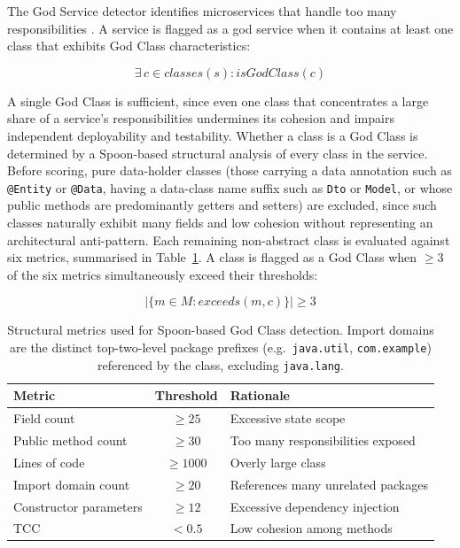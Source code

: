 \par The God Service detector identifies microservices that handle too many responsibilities \cite{Brown1998}. A service is flagged as a god service when it contains at least one class that exhibits God Class characteristics:

\begin{equation}
    \exists\, c \in \mathit{classes}(s) : \mathit{isGodClass}(c)
    \label{eq:god-service-detection}
\end{equation}

\noindent A single God Class is sufficient, since even one class that concentrates a large share of a service's responsibilities undermines its cohesion and impairs independent deployability and testability. Whether a class is a God Class is determined by a Spoon-based structural analysis of every class in the service. Before scoring, pure data-holder classes (those carrying a data annotation such as \texttt{@Entity} or \texttt{@Data}, having a data-class name suffix such as \texttt{Dto} or \texttt{Model}, or whose public methods are predominantly getters and setters) are excluded, since such classes naturally exhibit many fields and low cohesion without representing an architectural anti-pattern. Each remaining non-abstract class is evaluated against six metrics, summarised in Table~\ref{tab:god-class-metrics}. A class is flagged as a God Class when $\geq 3$ of the six metrics simultaneously exceed their thresholds:

\begin{equation}
    \bigl|\{m \in M : \mathit{exceeds}(m, c)\}\bigr| \geq 3
    \label{eq:god-class-multi-metric}
\end{equation}

\begin{table}[htbp]
    \centering
    \footnotesize
    \begin{tabular}{|l|c|p{6cm}|}
        \hline
        \textbf{Metric} & \textbf{Threshold} & \textbf{Rationale} \\
        \hline\hline
        Field count            & $\geq 25$  & Excessive state scope \\
        \hline
        Public method count    & $\geq 30$  & Too many responsibilities exposed \\
        \hline
        Lines of code          & $\geq 1000$& Overly large class \\
        \hline
        Import domain count    & $\geq 20$  & References many unrelated packages \\
        \hline
        Constructor parameters & $\geq 12$  & Excessive dependency injection \\
        \hline
        TCC                    & $< 0.5$    & Low cohesion among methods \\
        \hline
    \end{tabular}
    \caption{Structural metrics used for Spoon-based God Class detection. Import domains are the distinct top-two-level package prefixes (e.g.\ \texttt{java.util}, \texttt{com.example}) referenced by the class, excluding \texttt{java.lang}.}
    \label{tab:god-class-metrics}
\end{table}

